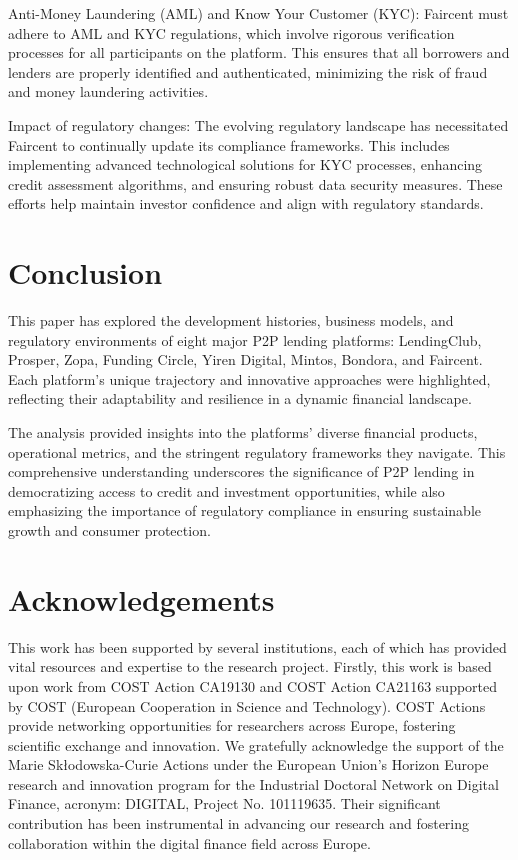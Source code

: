 \documentclass{article}
\begin{document}
\begin{itemize}
\begin{itemize}
        Anti-Money Laundering (AML) and Know Your Customer (KYC): Faircent must adhere to AML and KYC regulations, which involve rigorous verification processes for all participants on the platform. This ensures that all borrowers and lenders are properly identified and authenticated, minimizing the risk of fraud and money laundering activities.
        
        Impact of regulatory changes: The evolving regulatory landscape has necessitated Faircent to continually update its compliance frameworks. This includes implementing advanced technological solutions for KYC processes, enhancing credit assessment algorithms, and ensuring robust data security measures. These efforts help maintain investor confidence and align with regulatory standards.
    \end{itemize}

   
\end{itemize}

\section{Conclusion}
This paper has explored the development histories, business models, and regulatory environments of eight major P2P lending platforms: LendingClub, Prosper, Zopa, Funding Circle, Yiren Digital, Mintos, Bondora, and Faircent. Each platform's unique trajectory and innovative approaches were highlighted, reflecting their adaptability and resilience in a dynamic financial landscape. 

The analysis provided insights into the platforms' diverse financial products, operational metrics, and the stringent regulatory frameworks they navigate. This comprehensive understanding underscores the significance of P2P lending in democratizing access to credit and investment opportunities, while also emphasizing the importance of regulatory compliance in ensuring sustainable growth and consumer protection.

\newpage
\section{Acknowledgements}
This work has been supported by several institutions, each of which has provided vital resources and expertise to the research project. 
Firstly, this work is based upon work from COST Action CA19130 and COST Action CA21163 supported by COST (European Cooperation in Science and Technology). COST Actions provide networking opportunities for researchers across Europe, fostering scientific exchange and innovation. 
We gratefully acknowledge the support of the Marie Skłodowska-Curie Actions under the European Union's Horizon Europe research and innovation program for the Industrial Doctoral Network on Digital Finance, acronym: DIGITAL, Project No. 101119635. Their significant contribution has been instrumental in advancing our research and fostering collaboration within the digital finance field across Europe.
\end{document}

